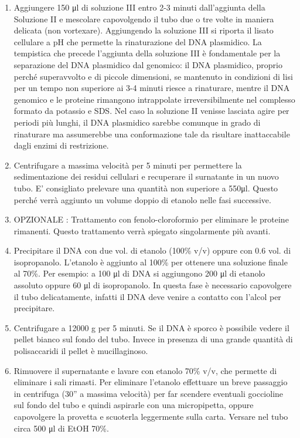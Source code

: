 \begin{enumerate}
  \item Aggiungere 150 μl di soluzione III entro 2-3 minuti dall’aggiunta della Soluzione II e
	mescolare capovolgendo il tubo due o tre volte in maniera delicata (non vortexare).
	Aggiungendo la soluzione III si riporta il lisato cellulare a pH che permette la rinaturazione del DNA plasmidico.
	La tempistica che precede l’aggiunta della soluzione III è fondamentale per la separazione del DNA plasmidico dal genomico:
	il DNA plasmidico, proprio perché superavvolto e di piccole dimensioni, se mantenuto in condizioni di lisi per un tempo non
	superiore ai 3-4 minuti riesce a rinaturare, mentre il DNA genomico e le proteine rimangono intrappolate irreversibilmente nel
	complesso formato da potassio e SDS. Nel caso la soluzione II venisse lasciata agire per periodi più lunghi,
	il DNA plasmidico sarebbe comunque in grado di rinaturare ma assumerebbe una conformazione tale da risultare inattaccabile
	dagli enzimi di restrizione.

  \item Centrifugare a massima velocità per 5 minuti per permettere la sedimentazione dei residui cellulari e recuperare
	il surnatante in un nuovo tubo. E’ consigliato prelevare una quantità non superiore a 550μl.
	Questo perché verrà aggiunto un volume doppio di etanolo nelle fasi successive.

  \item OPZIONALE : Trattamento con fenolo-cloroformio per eliminare le proteine rimanenti. Questo trattamento verrà
	spiegato singolarmente più avanti.

  \item Precipitare il DNA con due vol. di etanolo (100\% v/v) oppure con 0.6 vol. di isopropanolo. L'etanolo è aggiunto
	al 100\% per ottenere una soluzione finale al 70\%. Per esempio: a 100 μl di DNA si aggiungono 200 μl di etanolo
	assoluto oppure 60 μl di isopropanolo. In questa fase è necessario capovolgere il tubo delicatamente, infatti il DNA
	deve venire a contatto con l’alcol per precipitare.

  \item Centrifugare a 12000 g per 5 minuti. Se il DNA è sporco è possibile vedere il pellet bianco sul fondo del tubo.
	Invece in presenza di una grande quantità di polisaccaridi il pellet è mucillaginoso.

  \item Rimuovere il supernatante e lavare con etanolo 70\% v/v, che permette di eliminare i sali rimasti.
	Per eliminare l’etanolo effettuare un breve passaggio in centrifuga (30” a massima velocità) per far scendere eventuali
	goccioline sul fondo del tubo e quindi aspirarle con una micropipetta, oppure capovolgere la provetta e scuoterla
	leggermente sulla carta. Versare nel tubo circa 500 μl di EtOH 70\%.


\end{enumerate}

